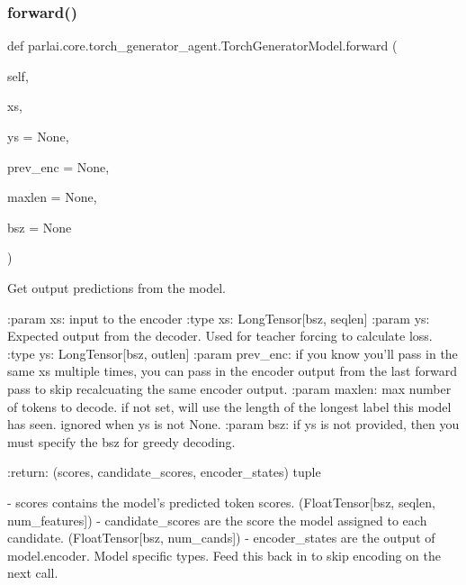 \subsubsection{\texorpdfstring{forward()}{forward()}}
{\footnotesize\ttfamily def parlai.\+core.\+torch\+\_\+generator\+\_\+agent.\+Torch\+Generator\+Model.\+forward (\begin{DoxyParamCaption}\item[{}]{self,  }\item[{}]{xs,  }\item[{}]{ys = {\ttfamily None},  }\item[{}]{prev\+\_\+enc = {\ttfamily None},  }\item[{}]{maxlen = {\ttfamily None},  }\item[{}]{bsz = {\ttfamily None} }\end{DoxyParamCaption})}

\begin{DoxyVerb}Get output predictions from the model.

:param xs:
    input to the encoder
:type xs:
    LongTensor[bsz, seqlen]
:param ys:
    Expected output from the decoder. Used
    for teacher forcing to calculate loss.
:type ys:
    LongTensor[bsz, outlen]
:param prev_enc:
    if you know you'll pass in the same xs multiple times, you can pass
    in the encoder output from the last forward pass to skip
    recalcuating the same encoder output.
:param maxlen:
    max number of tokens to decode. if not set, will use the length of
    the longest label this model has seen. ignored when ys is not None.
:param bsz:
    if ys is not provided, then you must specify the bsz for greedy
    decoding.

:return:
    (scores, candidate_scores, encoder_states) tuple

    - scores contains the model's predicted token scores.
      (FloatTensor[bsz, seqlen, num_features])
    - candidate_scores are the score the model assigned to each candidate.
      (FloatTensor[bsz, num_cands])
    - encoder_states are the output of model.encoder. Model specific types.
      Feed this back in to skip encoding on the next call.
\end{DoxyVerb}
 \mbox{\label{classparlai_1_1core_1_1torch__generator__agent_1_1TorchGeneratorModel_a828d2881fb73ead7d27691c73d1f6f36}} 
